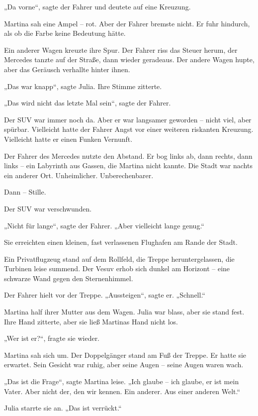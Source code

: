\documentclass[
]{article}
\begin{document}
„Da vorne``, sagte der Fahrer und deutete auf eine Kreuzung.

Martina sah eine Ampel -- rot. Aber der Fahrer bremste nicht. Er fuhr hindurch, als ob die Farbe keine Bedeutung hätte.

Ein anderer Wagen kreuzte ihre Spur. Der Fahrer riss das Steuer herum, der Mercedes tanzte auf der Straße, dann wieder geradeaus. Der andere Wagen hupte, aber das Geräusch verhallte hinter ihnen.

„Das war knapp``, sagte Julia. Ihre Stimme zitterte.

„Das wird nicht das letzte Mal sein``, sagte der Fahrer.

Der SUV war immer noch da. Aber er war langsamer geworden -- nicht viel, aber spürbar. Vielleicht hatte der Fahrer Angst vor einer weiteren riskanten Kreuzung. Vielleicht hatte er einen Funken Vernunft.

Der Fahrer des Mercedes nutzte den Abstand. Er bog links ab, dann rechts, dann links -- ein Labyrinth aus Gassen, die Martina nicht kannte. Die Stadt war nachts ein anderer Ort. Unheimlicher. Unberechenbarer.

Dann -- Stille.

Der SUV war verschwunden.

„Nicht für lange``, sagte der Fahrer. „Aber vielleicht lange genug.``

Sie erreichten einen kleinen, fast verlassenen Flughafen am Rande der Stadt.

Ein Privatflugzeug stand auf dem Rollfeld, die Treppe heruntergelassen, die Turbinen leise summend. Der Vesuv erhob sich dunkel am Horizont -- eine schwarze Wand gegen den Sternenhimmel.

Der Fahrer hielt vor der Treppe. „Aussteigen``, sagte er. „Schnell.``

Martina half ihrer Mutter aus dem Wagen. Julia war blass, aber sie stand fest. Ihre Hand zitterte, aber sie ließ Martinas Hand nicht los.

„Wer ist er?{\kern0pt}``, fragte sie wieder.

Martina sah sich um. Der Doppelgänger stand am Fuß der Treppe. Er hatte sie erwartet. Sein Gesicht war ruhig, aber seine Augen -- seine Augen waren wach.

„Das ist die Frage``, sagte Martina leise. „Ich glaube -- ich glaube, er ist mein Vater. Aber nicht der, den wir kennen. Ein anderer. Aus einer anderen Welt.``

Julia starrte sie an. „Das ist verrückt.``
\end{document}
